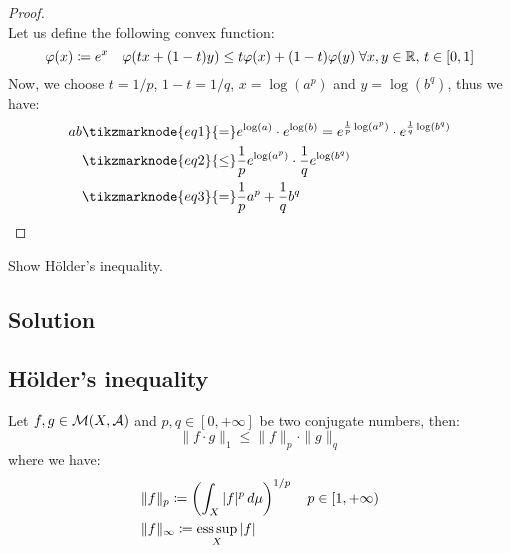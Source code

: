 \begin{proof}
    \hspace*{\fill}\\ %
    Let us define the following convex function:
    \[ \varphi(x) \coloneqq e^x \quad \varphi(tx + (1-t)y) \leq t\varphi(x) + (1-t)\varphi(y) \; \forall x,y \in \mathbb{R}, \, t \in [0,1] \]
    Now, we choose $t=1/p$, $1-t=1/q$, $x=\log(a^p)$ and $y=\log(b^q)$, thus we have:
    \begin{align*}
        ab & \tikzmarknode{eq1}{=} e^{\log(a)} \cdot e^{\log(b)} =  e^{\frac{1}{p}\log(a^p)} \cdot e^{\frac{1}{q}\log(b^q)} \\
        & \tikzmarknode{eq2}{\leq}  \frac{1}{p}e^{\log(a^p)} \cdot \frac{1}{q}e^{\log(b^q)} \\
        & \tikzmarknode{eq3}{=} \frac{1}{p} a^p + \frac{1}{q} b^q
    \end{align*}

\end{proof}


\question
Show Hölder's inequality.

\subsection*{Solution}

\subsection{Hölder's inequality}
Let $f,g \in \mathcal{M}(X,\mathcal{A})$ and $p,q \in [0,+\infty]$ be two conjugate numbers, then:
\[ \| f \cdot g \|_1 \leq \| f \|_p \cdot \| g \|_q \]
where we have:
\begin{align*}
    & \|f\|_p \coloneqq \left( \int_X |f|^p \, d\mu \right)^{1/p} \quad p \in [1,+\infty) \\
    & \|f\|_\infty \coloneqq \operatorname*{ess\,sup}_X |f|
\end{align*}

